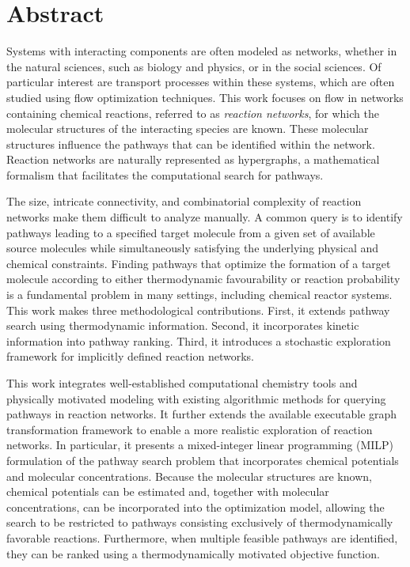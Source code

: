 \chapter{Abstract}
\label{ch:abstract}

Systems with interacting components are often modeled as networks, whether in the natural sciences, such as biology and physics, or in the social sciences. Of particular interest are transport processes within these systems, which are often studied using flow optimization techniques. This work focuses on flow in networks containing chemical reactions, referred to as \emph{reaction networks}, for which the molecular structures of the interacting species are known. These molecular structures influence the pathways that can be identified within the network. Reaction networks are naturally represented as hypergraphs, a mathematical formalism that facilitates the computational search for pathways.

The size, intricate connectivity, and combinatorial complexity of reaction networks make them difficult to analyze manually. A common query is to identify pathways leading to a specified target molecule from a given set of available source molecules while simultaneously satisfying the underlying physical and chemical constraints. Finding pathways that optimize the formation of a target molecule according to either thermodynamic favourability or reaction probability is a fundamental problem in many settings, including chemical reactor systems. This work makes three methodological contributions. First, it extends pathway search using thermodynamic information. Second, it incorporates kinetic information into pathway ranking. Third, it introduces a stochastic exploration framework for implicitly defined reaction networks.

This work integrates well-established computational chemistry tools and physically motivated modeling with existing algorithmic methods for querying pathways in reaction networks. It further extends the available executable graph transformation framework to enable a more realistic exploration of reaction networks. In particular, it presents a mixed-integer linear programming (MILP) formulation of the pathway search problem that incorporates chemical potentials and molecular concentrations. Because the molecular structures are known, chemical potentials can be estimated and, together with molecular concentrations, can be incorporated into the optimization model, allowing the search to be restricted to pathways consisting exclusively of thermodynamically favorable reactions. Furthermore, when multiple feasible pathways are identified, they can be ranked using a thermodynamically motivated objective function.

